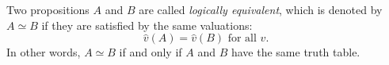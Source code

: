 \begin{dfn}
\label{dfn:LogEqProp}
Two propositions $A$ and $B$ are called \emph{logically equivalent}, which is denoted by $A \simeq B$ if they are satisfied by the same valuations:
\[
\hat{v}(A) = \hat{v}(B) \text{ for all }v.
\]
In other words, $A \simeq B$ if and only if $A$ and $B$ have the same truth table.
\end{dfn}
